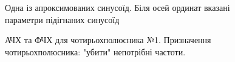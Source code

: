 \begin{figure}[h]
\caption{Одна із апроксимованих синусоїд. Біля осей ординат вказані параметри підігнаних синусоїд}
\label{fit}
\end{figure}
\begin{figure}[h]
\caption{АЧХ та ФЧХ для чотирьохполюсника №1. Призначення чотирьохполюсника: "убити" непотрібні частоти.}
\label{res1}
\end{figure}
